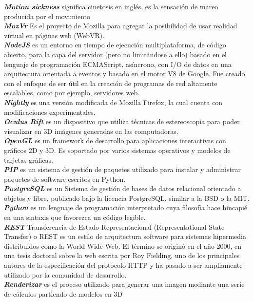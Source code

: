 \documentclass[12pt]{article}
\begin{document}
\textbf{\textit{Motion sickness}} significa cinetosis en inglés, es la sensación de mareo producida por el movimiento\\
\textbf{\textit{MozVr}} Es el proyecto de Mozilla para agregar la posibilidad de usar realidad virtual en páginas web (WebVR).\\
\textbf{\textit{NodeJS}} es un entorno en tiempo de ejecución multiplataforma, de código abierto, para la capa del servidor (pero no limitándose a ello) basado en el lenguaje de programación ECMAScript, asíncrono, con I/O de datos en una arquitectura orientada a eventos y basado en el motor V8 de Google. Fue creado con el enfoque de ser útil en la creación de programas de red altamente escalables, como por ejemplo, servidores web.\\
\textbf{\textit{Nightly}} es una versión modificada de Mozilla Firefox, la cual cuenta con modificaciones experimentales.\\
\textbf{\textit{Oculus Rift}} es un dispositivo que utiliza técnicas de estereoscopía para poder visualizar en 3D imágenes generadas en las computadoras.\\ 
\textbf{\textit{OpenGL}} es un framework de desarrollo para aplicaciones interactivas con gráficos 2D y 3D. Es soportado por varios sistemas operativos y modelos de tarjetas gráficas.\\
\textbf{\textit{PIP}} es un sistema de gestión de paquetes utilizado para instalar y administrar paquetes de software escritos en Python.\\
\textbf{\textit{PostgreSQL}} es un Sistema de gestión de bases de datos relacional orientado a objetos y libre, publicado bajo la licencia PostgreSQL, similar a la BSD o la MIT.\\
\textbf{\textit{Python}} es un lenguaje de programación interpretado cuya filosofía hace hincapié en una sintaxis que favorezca un código legible.\\
\textbf{\textit{REST}} Transferencia de Estado Representacional (Representational State Transfer) o REST es un estilo de arquitectura software para sistemas hipermedia distribuidos como la World Wide Web. El término se originó en el año 2000, en una tesis doctoral sobre la web escrita por Roy Fielding, uno de los principales autores de la especificación del protocolo HTTP y ha pasado a ser ampliamente utilizado por la comunidad de desarrollo.\\
\textbf{\textit{Renderizar}} es el proceso utilizado para generar una imagen mediante una serie de cálculos partiendo de modelos en 3D\\
\end{document}
